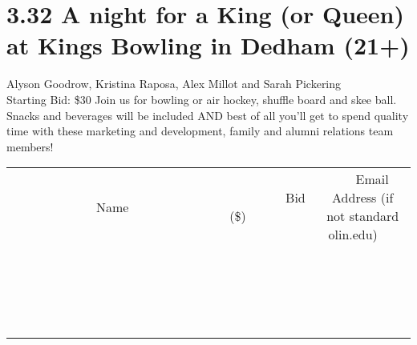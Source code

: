 \documentclass[11pt]{article}
\begin{document}
\section*{3.32 A night for a King (or Queen) at Kings Bowling in Dedham (21+)}
Alyson Goodrow, Kristina Raposa, Alex Millot and Sarah Pickering
\\
Starting Bid: \$30
\newline
Join us for bowling or air hockey, shuffle board and skee ball. Snacks and beverages will be included AND best of all you'll get to spend quality time with these marketing and development, family and alumni relations team members!
\\[3ex]
\begin{tabular}{c c c}
~~~~~~~~~~~~~Name~~~~~~~~~~~~~ & ~~~~~~~~~Bid (\$)~~~~~~~~~  & ~~~Email Address (if not standard olin.edu)~~~\\
 & & \\
\hline
 & & \\
\hline
 & & \\
\hline
 & & \\
\hline
 & & \\
\hline
 & & \\
\hline
 & & \\
\hline
 & & \\
\hline
 & & \\
\hline
 & & \\
\hline
 & & \\
\hline
 & & \\
\hline
 & & \\
\hline
 & & \\
\hline
 & & \\
\hline
 & & \\
\hline
 & & \\
\hline
 & & \\
\hline
 & & \\
\hline
\end{tabular}
\newpage
\end{document}

